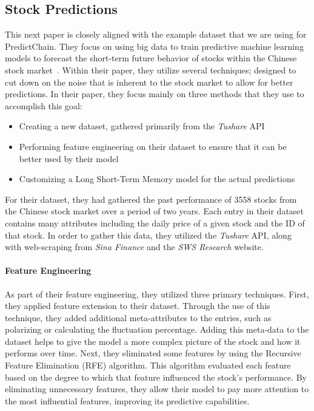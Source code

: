 \documentclass{article}
\begin{document}
    \subsection{Stock Predictions}

    This next paper is closely aligned with the example dataset that we are using for PredictChain.  They focus on
    using big data to train predictive machine learning models to forecast the short-term future behavior of stocks
    within the Chinese stock market~\cite{deepPrediction}.  Within their paper, they utilize several techniques; designed
    to cut down on the noise that is inherent to the stock market to allow for better predictions.  In their paper,
    they focus mainly on three methods that they use to accomplish this goal:

    \begin{itemize}
        \item Creating a new dataset, gathered primarily from the \textit{Tushare} API
        \item Performing feature engineering on their dataset to ensure that it can be better used by their model
        \item Customizing a Long Short-Term Memory model for the actual predictions
    \end{itemize}

    For their dataset, they had gathered the past performance of 3558 stocks from the Chinese stock market over
    a period of two years.  Each entry in their dataset contains many attributes including the daily price of a
    given stock and the ID of that stock.  In order to gather this data, they utilized the \textit{Tushare} API, along
    with web-scraping from \textit{Sina Finance} and the \textit{SWS Research} website.

    \paragraph{Feature Engineering}
    As part of their feature engineering, they utilized three primary techniques.  First, they applied feature extension
    to their dataset.  Through the use of this technique, they added additional meta-attributes to the entries, such
    as polarizing or calculating the fluctuation percentage.  Adding this meta-data to the dataset helps to give the model
    a more complex picture of the stock and how it performs over time.  Next, they eliminated some features by using the
    Recursive Feature Elimination (RFE) algorithm.  This algorithm evaluated each feature based on the degree to which
    that feature influenced the stock's performance.  By eliminating unnecessary features, they allow their model to
    pay more attention to the most influential features, improving its predictive capabilities.
\end{document}
